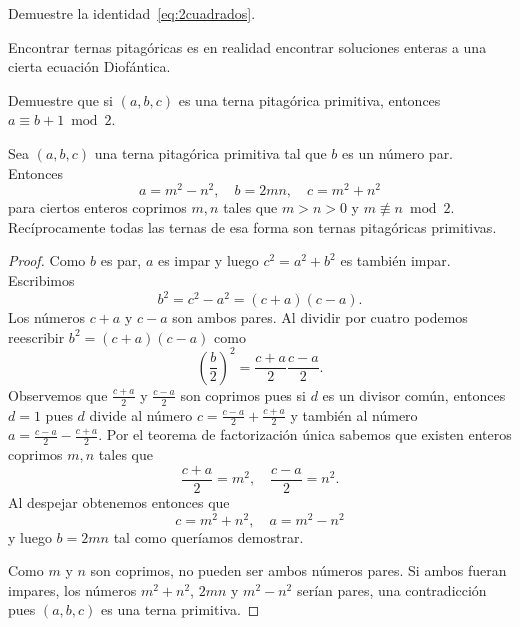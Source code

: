 \begin{exercise}
Demuestre la identidad~\eqref{eq:2cuadrados}. 
\end{exercise}


Encontrar ternas pitagóricas es en realidad
encontrar soluciones enteras a una cierta ecuación Diofántica. 

\begin{exercise}
	\label{xca:paridad}
	Demuestre que si $(a,b,c)$ es una terna pitagórica primitiva, entonces $a\equiv b+1\bmod
	2$. 
\end{exercise}


\begin{theorem}
	\label{thm:ternas_pitagoricas}
	Sea $(a,b,c)$ una terna pitagórica primitiva tal que $b$ es un número par.
	Entonces 
	\[
		a=m^2-n^2,\quad
		b=2mn,\quad
		c=m^2+n^2
	\]
	para ciertos enteros coprimos $m,n$ tales que $m>n>0$ y $m\not\equiv n\bmod
	2$. Recíprocamente todas las ternas de esa forma son ternas pitagóricas
	primitivas. 
\end{theorem}

\begin{proof}
	Como $b$ es par, $a$ es impar y luego $c^2=a^2+b^2$ es también impar. Escribimos
	\[
		b^2=c^2-a^2=(c+a)(c-a). 
	\]
	Los números $c+a$ y $c-a$ son ambos pares. Al dividir por
	cuatro podemos reescribir $b^2=(c+a)(c-a)$ como 
	\[
		\left(\frac{b}{2}\right)^2=\frac{c+a}{2}\frac{c-a}{2}.
	\]
	Observemos que $\frac{c+a}{2}$ y $\frac{c-a}{2}$ son coprimos pues si $d$
	es un divisor común, entonces $d=1$ pues $d$ divide al número 
	$c=\frac{c-a}{2}+\frac{c+a}{2}$ y también al número 
	$a=\frac{c-a}{2}-\frac{c+a}{2}$. Por el teorema de factorización única
	sabemos que existen enteros coprimos $m,n$ tales que
	\[
		\frac{c+a}{2}=m^2,\quad
		\frac{c-a}{2}=n^2.
	\]
	Al despejar obtenemos entonces que 
	\[
		c=m^2+n^2,\quad
		a=m^2-n^2
	\]
	y luego $b=2mn$ tal como queríamos demostrar. 
	
	Como $m$ y $n$ son coprimos,
	no pueden ser ambos números pares. Si ambos fueran impares, los números
	$m^2+n^2$, $2mn$ y $m^2-n^2$ serían pares, una contradicción pues $(a,b,c)$
	es una terna primitiva.
\end{proof}

